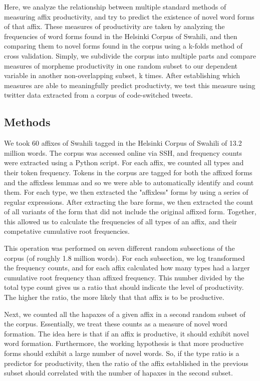 \documentclass[12pt]{article}\usepackage[]{graphicx}\usepackage[]{color}
\begin{document}
\noindent Here, we analyze the relationship between multiple standard methods of measuring affix productivity, and try to predict the existence of novel word forms of that affix. These measures of productivity are taken by analyzing the frequencies of word forms found in the Helsinki Corpus of Swahili, and then comparing them to novel forms found in the corpus using a k-folds method of cross validation. Simply, we subdivide the corpus into multiple parts and compare measures of morpheme productivity in one random subset to our dependent variable in another non-overlapping subset, k times. After establishing which measures are able to meaningfully predict productivty, we test this measure using twitter data extracted from a corpus of code-switched tweets.

\subsection{Methods}

We took 60 affixes of Swahili tagged in the Helsinki Corpus of Swahili of 13.2 million words. The corpus was accessed online via SSH, and frequency counts were extracted using a Python script. For each affix, we counted all types and their token frequency. Tokens in the corpus are tagged for both the affixed forms and the affixless lemmas and so we were able to automatically identify and count them. For each type, we then extracted the "affixless" forms by using a series of regular expressions. After extracting the bare forms, we then extracted the count of all variants of the form that did not include the original affixed form. Together, this allowed us to calculate the frequencies of all types of an affix, and their competative cumulative root frequencies.

\noindent This operation was performed on seven different random subsections of the corpus (of roughly 1.8 million words). For each subsection, we log transformed the frequency counts, and for each affix calculated how many types had a larger cumulative root frequency than affixed frequency. This number divided by the total type count gives us a ratio that should indicate the level of productivity. The higher the ratio, the more likely that that affix is to be productive. 

\noindent Next, we counted all the hapaxes of a given affix in a second random subset of the corpus. Essentially, we treat these counts as a measure of novel word formation. The idea here is that if an affix is productive, it should exhibit novel word formation. Furthermore, the working hypothesis is that more productive forms should exhibit a large number of novel words. So, if the type ratio is a predictor for productivity, then the ratio of the affix established in the previous subset should correlated with the number of hapaxes in the second subset.
\end{document}
